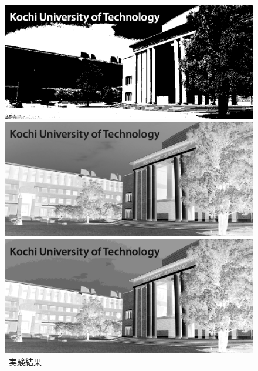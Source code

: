 \begin{figure}[H]
\begin{minipage}[b]{.23\textwidth}
    \end{minipage}
    \begin{minipage}[b]{.23\textwidth}
        \centering
        \includegraphics[keepaspectratio,width=\textwidth]{../../Figures/05_24_1bit.png}
    \end{minipage}
    \caption{\kadaiab\ 実験結果}
    \begin{minipage}[b]{.23\textwidth}
        \centering
        \includegraphics[keepaspectratio,width=\textwidth]{../../Figures/05_31_8.png}
    \end{minipage}
    \begin{minipage}[b]{.23\textwidth}
        \centering
        \includegraphics[keepaspectratio,width=\textwidth]{../../Figures/05_32_4.png}

\end{minipage}
\end{figure}
